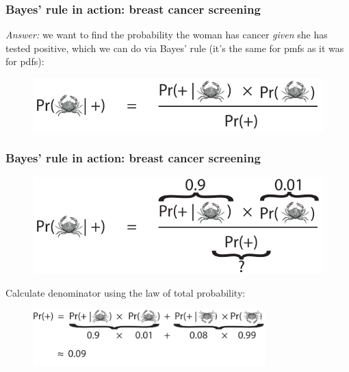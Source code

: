 \documentclass{beamer}
\begin{document}
	\begin{frame}
		\frametitle{Bayes' rule in action: breast cancer screening}
		
		\textit{Answer:} we want to find the probability the woman has cancer \textit{given} she has tested positive, which we can do via Bayes' rule (it's the same for pmfs as it was for pdfs):
		
		\begin{figure}[ht]
			\includegraphics[width=1\textwidth]{./figures/lec1_cancer.pdf}
		\end{figure}
		
	\end{frame}
	
	\begin{frame}
		\frametitle{Bayes' rule in action: breast cancer screening}
		
		\begin{figure}[ht]
			\includegraphics[width=1\textwidth]{./figures/lec1_cancer2.pdf}
		\end{figure}
	
		Calculate denominator using the law of total probability:
		
		\begin{figure}[ht]
			\includegraphics[width=0.8\textwidth]{./figures/lec1_cancer3.pdf}
		\end{figure}
		
	\end{frame}
	
\end{document}
